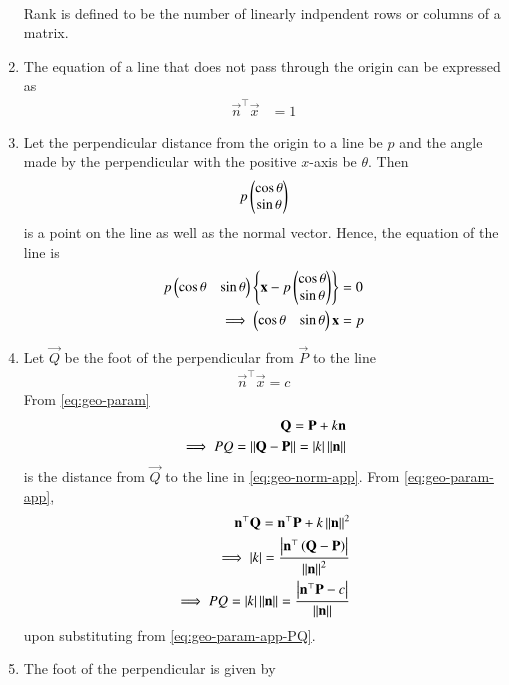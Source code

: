 \begin{enumerate}[label=\thesubsection.\arabic*.,ref=\thesubsection.\theenumi]
\begin{align}
		\end{align}
			  Rank is defined to be the number of linearly indpendent rows or columns of a matrix.
			  \fi
		\item
The equation of a line that does not pass through the origin can be expressed as
\begin{align}
	 \vec{n}^{\top}\vec{x} &=   1
		\label{prop:lin-eq-unit}
\end{align}
\item Let the perpendicular distance from the origin to a line be $p$ and the angle made by the perpendicular with the positive $x$-axis be $\theta$.
	Then 
\begin{align}
	p\begin{pmatrix}\cos \theta \\ \sin \theta\end{pmatrix}
\end{align}
is a point on the line as well as the normal vector.
Hence, the equation of the line is 
\begin{align}
	p\begin{pmatrix}\cos \theta & \sin \theta\end{pmatrix}
	\left\{\mathbf{x}-p\begin{pmatrix}\cos \theta \\ \sin \theta\end{pmatrix}\right\} &= 0
	\\
	\implies 
	\begin{pmatrix}\cos \theta & \sin \theta\end{pmatrix}
	\mathbf{x} &= p
\label{eq:chapters/11/10/2/8-final}
\end{align}
\item Let $\vec{Q}$ be the foot of the perpendicular from $\vec{P}$
	to the line
\begin{align}
			\label{eq:geo-norm-app}
    \vec{n}^{\top}  \vec{x} = c
\end{align}
From
			\eqref{eq:geo-param}
\begin{align}
			\label{eq:geo-param-app}
	\mathbf{Q} = \mathbf{P} + k\mathbf{n}
	\\
	\implies PQ = \left\lVert\mathbf{Q} - \mathbf{P}\right\rVert=\left\vert k\right\vert \left\lVert\mathbf{n}\right\rVert
			\label{eq:geo-param-app-PQ}
\end{align}
is the distance from $\vec{Q}$
to the line in 
			\eqref{eq:geo-norm-app}.
			From \eqref{eq:geo-param-app},
\begin{align}
	\mathbf{n}^{\top}  \mathbf{Q} = \mathbf{n}^{\top}  \mathbf{P} + k\left\lVert\mathbf{n}\right\rVert^2
	\\
	\implies \left\vert k\right\vert = 
	\frac{\left\vert\mathbf{n}^{\top}\left(\mathbf{Q} - \mathbf{P}\right)\right\vert}{\left\lVert\mathbf{n}\right\rVert^2}
			\label{eq:geo-param-app-k}
			\\
	\implies PQ =\left\vert k\right\vert  
		\left\lVert\mathbf{n}\right\rVert	=
	\frac{\left\vert\mathbf{n}^{\top}\mathbf{P} - c\right\vert}{\left\lVert\mathbf{n}\right\rVert}
			\label{eq:PQ-final}
\end{align}
upon substituting from 
			\eqref{eq:geo-param-app-PQ}.
\item The foot of the perpendicular is given by

\end{enumerate}
